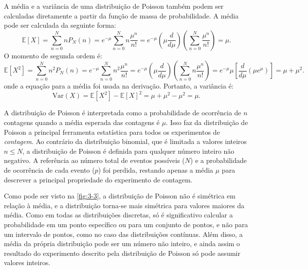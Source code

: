 A média e a variância de uma distribuição de Poisson também podem ser calculadas diretamente a partir da função de massa de probabilidade. A média pode ser calculada da seguinte forma:
\begin{equation*}
	\mathbb{E}[X] = \sum_{n=0}^{N} n P_N(n) = e^{- \mu}\sum_{n=0}^{N} n \dfrac{\mu^n}{n!}  = e^{- \mu} \left(\mu \dfrac{d}{d\mu}\right)\left(\sum_{n=0}^{N}\dfrac{\mu^n}{n!}\right) = \mu.
\end{equation*}
O momento de segunda ordem é:
\begin{equation*}
	\mathbb{E}[X^2] = \sum_{n=0}^{N} n^2 P_N(n) = e^{- \mu}\sum_{n=0}^{N} n^2 \dfrac{\mu^n}{n!} =  e^{- \mu} \left(\mu \dfrac{d}{d\mu}\right)\left(\sum_{n=0}^{N}n\dfrac{\mu^n}{n!}\right) = e^{-\mu} \mu \left[\dfrac{d}{d\mu}(\mu e^{\mu})\right] = \mu + \mu^2.
\end{equation*}
onde a equação para a média foi usada na derivação. Portanto, a variância é:
\begin{equation*}
\text{Var}(X) = \mathbb{E}[X^2] - \mathbb{E}[X]^2 = \mu + \mu^2 - \mu^2 = \mu.
\end{equation*}

A distribuição de Poisson é interpretada como a probabilidade de ocorrência de \(n\) contagens quando a média esperada das contagens é $\mu$. Isso faz da distribuição de Poisson a principal ferramenta estatística para todos os experimentos de \textit{contagem}. Ao contrário da distribuição binomial, que é limitada a valores inteiros $n \leq N$, a distribuição de Poisson é definida para qualquer número inteiro não negativo. A referência ao número total de eventos possíveis ($N$) e a probabilidade de ocorrência de cada evento ($p$) foi perdida, restando apenas a média $\mu$ para descrever a principal propriedade do experimento de contagem.

Como pode ser visto na \autoref{fig:3-3}, a distribuição de Poisson não é simétrica em relação à média, e a distribuição torna-se mais simétrica para valores maiores da média. Como em todas as distribuições discretas, só é significativo calcular a probabilidade em um ponto específico ou para um conjunto de pontos, e não para um intervalo de pontos, como no caso das distribuições contínuas. Além disso, a média da própria distribuição pode ser um número não inteiro, e ainda assim o resultado do experimento descrito pela distribuição de Poisson só pode assumir valores inteiros.

